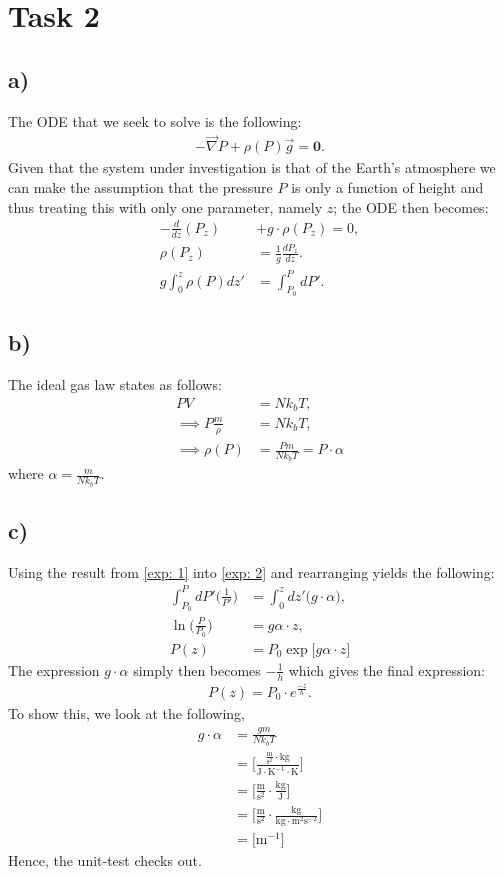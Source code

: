 \documentclass{article}
\begin{document}
\section*{Task 2}
\subsection*{a)}
The ODE that we seek to solve is the following:
\begin{align*}
    - \Vec{\nabla}P + \rho(P)\Vec{g} = \mathbf{0}.
\end{align*} Given that the system under investigation is that of the Earth's atmosphere we can make the assumption that the pressure $P$ is only a function of height and thus treating this with only one parameter, namely $z$; the ODE then becomes:
\begin{align}
    - \frac{d}{dz}(P_z) &+ g\cdot\rho(P_z) = 0,\nonumber\\
    \rho(P_z)&=\frac{1}{g}\frac{d P_z}{dz}. \label{exp: 1}\\
    g\int_{0}^z\rho(P)dz' &= \int_{P_0}^{P}dP'.\nonumber
\end{align}
\subsection*{b)}
The ideal gas law states as follows:
\begin{align}
    PV &= Nk_bT\nonumber, \\
    \implies P\frac{m}{\rho} &= Nk_bT\nonumber,\\
    \implies\rho(P) &= \frac{Pm}{Nk_bT} = P \cdot \alpha\label{exp: 2}
\end{align}where $\alpha = \frac{m}{Nk_bT}$.
\subsection*{c)} Using the result from \eqref{exp: 1} into \eqref{exp: 2}  and rearranging yields the following:
\begin{align*}
    \int_{P_0}^P dP' \Big(\frac{1}{P'}\Big) &= \int_0^z dz'\Big(g\cdot\alpha\Big),\\
    \ln\Big(\frac{P}{P_0}\Big)&=g\alpha\cdot z,\\
    P(z) &= P_0\exp\Big[g\alpha\cdot z\Big]
\end{align*}The expression $g\cdot \alpha$ simply then becomes $-\frac{1}{h}$ which gives the final expression:
\begin{align*}
    P(z) = P_0\cdot e^{\frac{-z}{h}}.
\end{align*}To show this, we look at the following,
\begin{align*}
    g\cdot \alpha &= \frac{gm}{Nk_bT}\\
    &=\Big[\frac{\frac{\text{m}}{\text{s}^2}\cdot\text{kg}}{\text{J}\cdot\text{K}^{-1}\cdot\text{K}}\Big]\\
    &=\Big[\frac{\text{m}}{\text{s}^2}\cdot\frac{\text{kg}}{\text{J}}\Big]\\
    &=\Big[\frac{\text{m}}{\text{s}^2}\cdot\frac{\text{kg}}{\text{kg}\cdot\text{m}^2\text{s}^{-2}}\Big]\\
    &=\Big[\text{m}^{-1}\Big]
\end{align*}Hence, the unit-test checks out.
\end{document}
